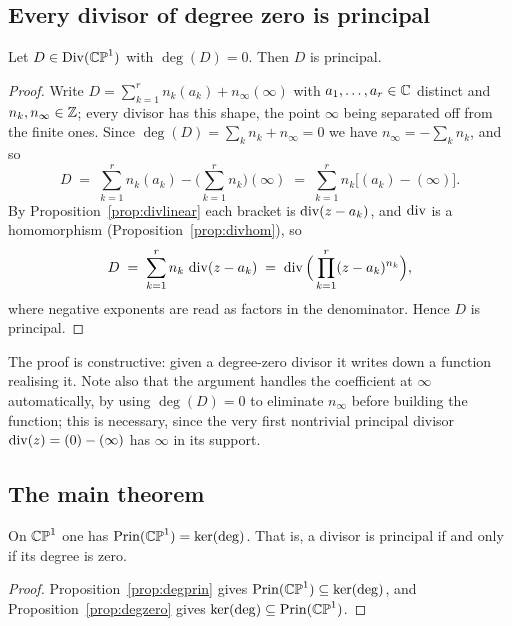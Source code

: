 \subsection{Every divisor of degree zero is principal}

\begin{smjproposition}\label{prop:degzero}
Let $D \in \operatorname{Div}(\mathbb{CP}^1)$ with $\deg(D) = 0$. Then $D$ is principal.
\end{smjproposition}

\begin{proof}
Write $D = \sum_{k=1}^{r} n_k (a_k) + n_\infty(\infty)$ with
$a_1, \dots, a_r \in \mathbb{C}$ distinct and $n_k, n_\infty \in \mathbb{Z}$; every divisor has
this shape, the point $\infty$ being separated off from the finite ones. Since
$\deg(D) = \sum_k n_k + n_\infty = 0$ we have $n_\infty = -\sum_k n_k$, and so
\[
D \;=\; \sum_{k=1}^{r} n_k (a_k) - \Big(\sum_{k=1}^{r} n_k\Big)(\infty)
\;=\; \sum_{k=1}^{r} n_k\big[(a_k)-(\infty)\big].
\]
By Proposition~\ref{prop:divlinear} each bracket is $\operatorname{div}(z-a_k)$, and $\operatorname{div}$
is a homomorphism (Proposition~\ref{prop:divhom}), so
\[
D \;=\; \sum_{k=1}^{r} n_k\, \operatorname{div}(z-a_k)
\;=\; \operatorname{div}\Big(\prod_{k=1}^{r}(z-a_k)^{n_k}\Big),
\]
where negative exponents are read as factors in the denominator. Hence $D$ is
principal.
\end{proof}

\begin{remark}
The proof is constructive: given a degree-zero divisor it writes down a function
realising it. Note also that the argument handles the coefficient at $\infty$
automatically, by using $\deg(D) = 0$ to eliminate $n_\infty$ before building the
function; this is necessary, since the very first nontrivial principal divisor
$\operatorname{div}(z) = (0)-(\infty)$ has $\infty$ in its support.
\end{remark}

\subsection{The main theorem}

\begin{theorem}\label{thm:main}
On $\mathbb{CP}^1$ one has $\operatorname{Prin}(\mathbb{CP}^1) = \ker(\deg)$. That is, a divisor is principal if
and only if its degree is zero.
\end{theorem}

\begin{proof}
Proposition~\ref{prop:degprin} gives $\operatorname{Prin}(\mathbb{CP}^1) \subseteq \ker(\deg)$, and
Proposition~\ref{prop:degzero} gives $\ker(\deg) \subseteq \operatorname{Prin}(\mathbb{CP}^1)$.
\end{proof}

